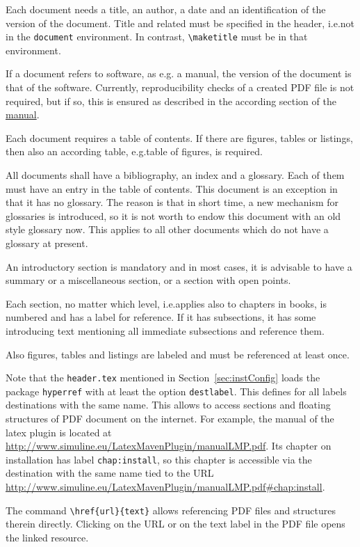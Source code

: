 \documentclass[a4paper,12pt]{article}
\newcommand{\manref}[2]{\href{http://www.simuline.eu/LatexMavenPlugin/manualLMP.pdf#1}{#2}}
\newcommand{\pkg}[1]{\texttt{#1}\index{package #1}}
\newcommand{\cmd}[1]{\texttt{\textbackslash #1}\index{command \textbackslash #1}}
\newcommand{\file}[1]{\texttt{#1}\index{file #1}}
\begin{document}
Each document needs a title, an author, 
a date and an identification of the version of the document. 
Title and related must be specified in the header, i.e.\@ not in the \texttt{document} environment. 
In contrast, \cmd{maketitle} must be in that environment. 

If a document refers to software, as e.g\@. a manual, 
the version of the document is that of the software. 
Currently, reproducibility checks of a created PDF file is not required, 
but if so, this is ensured as described 
in the according section of the \manref{\#sec:chkReprod}{manual}. 

Each document requires a table of contents. 
If there are figures, tables or listings, then also an according table, 
e.g.\@ table of figures, is required. 

All documents shall have a bibliography, an index and a glossary. 
Each of them must have an entry in the table of contents. 
This document is an exception in that it has no glossary. 
The reason is that in short time, a new mechanism for glossaries is introduced, 
so it is not worth to endow this document with an old style glossary now. 
This applies to all other documents which do not have a glossary at present. 

An introductory section is mandatory and in most cases, 
it is advisable to have a summary or a miscellaneous section, 
or a section with open points. 

Each section, no matter which level, i.e.\@ applies also to chapters in books, 
is numbered and has a label for reference. 
If it has subsections, it has some introducing text mentioning all immediate subsections 
and reference them. 

Also figures, tables and listings are labeled and must be referenced at least once. 

Note that the \file{header.tex} mentioned in Section~\ref{sec:instConfig} 
loads the package \pkg{hyperref} with at least the option \texttt{destlabel}. 
This defines for all labels destinations with the same name. 
This allows to access sections and floating structures 
of PDF document on the internet. 
For example, the manual of the latex plugin 
is located at \url{http://www.simuline.eu/LatexMavenPlugin/manualLMP.pdf}. 
Its chapter on installation has label \texttt{chap:install}, 
so this chapter is accessible 
via the destination with the same name 
tied to the URL 
\url{http://www.simuline.eu/LatexMavenPlugin/manualLMP.pdf#chap:install}. 

The command \texttt{\textbackslash href\{url\}\{text\}} 
allows referencing PDF files and structures therein directly. 
Clicking on the URL or on the text label in the PDF file opens the linked resource. 
\end{document}
